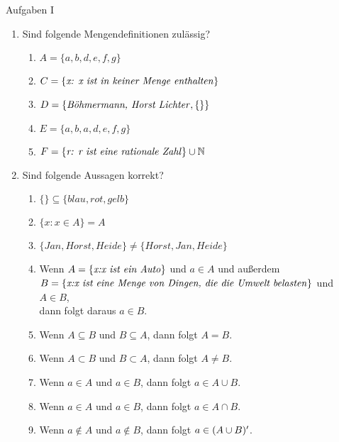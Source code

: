 \begin{frame}
  {Aufgaben I}
  \onslide<+->
  \begin{enumerate}[<+->]\scriptsize
    \item Sind folgende Mengendefinitionen zulässig?
      \Viertelzeile
      \begin{enumerate}[<+->]\scriptsize
        \item $A=\{a,b,d,e,f,g\}$
        \item $C=\{\text{\textit{x: x ist in keiner Menge enthalten}}\}$
        \item $D=\{\text{\textit{Böhmermann, Horst Lichter}}, \{\}\}$
        \item $E=\{a,b,a,d,e,f,g\}$
        \item $F=\{\text{\textit{r: r ist eine rationale Zahl}}\}\cup\mathbb{N}$
      \end{enumerate}
      \Halbzeile
    \item Sind folgende Aussagen korrekt?
      \Viertelzeile
      \begin{enumerate}[<+->]\scriptsize
        \item $\{\}\subseteq\{blau,rot,gelb\}$
        \item $\{x:x\in A\}=A$
        \item $\{Jan, Horst, Heide\}\not=\{Horst,Jan,Heide\}$
        \item Wenn $A=\{\text{\textit{x:x ist ein Auto}}\}$ und $a\in A$ und außerdem\\
          $B=\{\text{\textit{x:x ist eine Menge von Dingen, die die Umwelt belasten}}\}$ und $A\in B$,\\
          dann folgt daraus $a\in B$.
        \item Wenn $A\subseteq B$ und $B\subseteq A$, dann folgt $A=B$.
        \item Wenn $A\subset B$ und $B\subset A$, dann folgt $A\not=B$.
        \item Wenn $a\in A$ und $a\in B$, dann folgt $a\in A\cup B$.
        \item Wenn $a\in A$ und $a\in B$, dann folgt $a\in A\cap B$.
        \item Wenn $a\not\in A$ und $a\not\in B$, dann folgt $a\in (A\cup B)^{\prime}$.
      \end{enumerate}
  \end{enumerate}
\end{frame}

